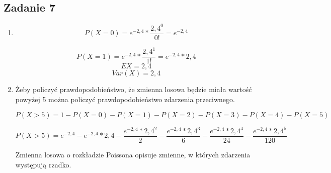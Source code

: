 \subsection{Zadanie 7}

\begin{enumerate}[label=(\alph*)]
\item
$$
P(X=0) = e^{-2,4}*\frac{2,4^{0}}{0!}=e^{-2,4}
$$

$$
P(X=1)= e^{-2,4}*\frac{2,4^{1}}{1!}=e^{-2,4}*2,4
$$
$$ 
EX=2,4
$$
$$
Var(X)=2,4
$$

\item Żeby policzyć prawdopodobieństwo, że zmienna losowa będzie
miała wartość powyżej 5 można policzyć prawdopodobieństwo zdarzenia
przeciwnego.

$$
P(X>5)=1-P(X=0)-P(X=1)-P(X=2)-P(X=3)-P(X=4)-P(X=5)
$$

$$
P(X>5)= e^{-2,4}
-e^{-2,4}*2,4 
-\frac{e^{-2,4}*2,4^{2}}{2}- 
\frac{e^{-2,4}*2,4^{3}}{6}-
\frac{e^{-2,4}*2,4^{4}}{24}-
\frac{e^{-2,4}*2,4^{5}}{120}
$$

Zmienna losowa o rozkładzie Poissona opisuje zmienne, w których zdarzenia występują rzadko.
\end{enumerate}
